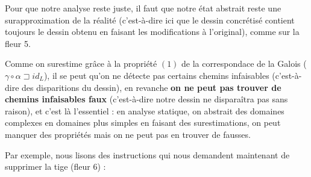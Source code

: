 \documentclass[french]{article}
\begin{document}
  Pour que notre analyse reste juste, il faut que notre état abstrait reste une surapproximation de la réalité (c'est-à-dire ici que le dessin concrétisé contient toujours le dessin obtenu en faisant les modifications à l'original), comme sur la fleur 5.
  
  Comme on surestime grâce à la propriété $(1)$ de la correspondace de la Galois ($\gamma \circ \alpha \sqsupset id_L$), il se peut qu'on ne détecte pas certains chemins infaisables (c'est-à-dire des disparitions du dessin), en revanche \textbf{on ne peut pas trouver de chemins infaisables faux} (c'est-à-dire notre dessin ne disparaîtra pas sans raison), et c'est là l'essentiel : en analyse statique, on abstrait des domaines complexes en domaines plus simples en faisant des surestimations, on peut manquer des propriétés mais on ne peut pas en trouver de fausses.
  
  Par exemple, nous lisons des instructions qui nous demandent maintenant de supprimer la tige (fleur 6) :
  
\end{document}
